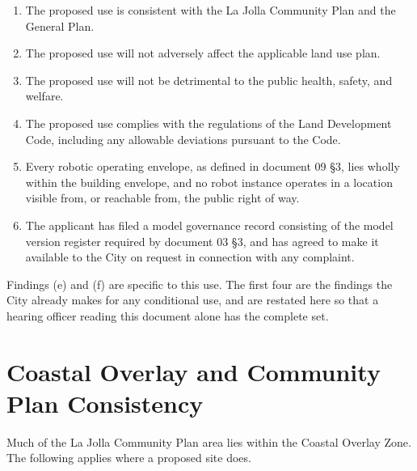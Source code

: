 \begin{enumerate}
\item The proposed use is consistent with the La Jolla Community Plan and the
  General Plan.

\item The proposed use will not adversely affect the applicable land use plan.

\item The proposed use will not be detrimental to the public health, safety, and
  welfare.

\item The proposed use complies with the regulations of the Land Development
  Code, including any allowable deviations pursuant to the Code.

\item Every robotic operating envelope, as defined in document 09 §3, lies
  wholly within the building envelope, and no robot instance operates in a
  location visible from, or reachable from, the public right of way.

\item The applicant has filed a model governance record consisting of the model
  version register required by document 03 §3, and has agreed to make it
  available to the City on request in connection with any complaint.
\end{enumerate}

Findings (e) and (f) are specific to this use. The first four are the findings
the City already makes for any conditional use, and are restated here so that a
hearing officer reading this document alone has the complete set.

\section{Coastal Overlay and Community Plan Consistency}

Much of the La Jolla Community Plan area lies within the Coastal Overlay Zone.
The following applies where a proposed site does.

